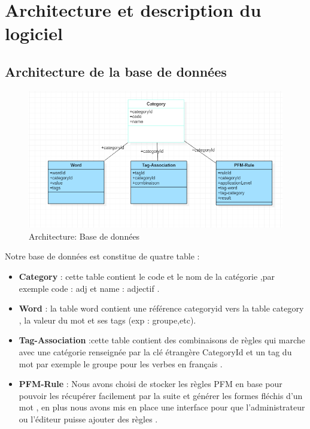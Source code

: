 \documentclass[12pt,a4paper]{article}
\begin{document}
\section{Architecture et description du logiciel}
\subsection{Architecture de la base de données }





\begin{figure}[h]
\centering
\includegraphics[width=150mm]{img/basefinal.PNG}
\caption{Architecture: Base de données}
\label{Tux}
\end{figure}

\newpage
Notre base de données est constitue de quatre table : 
\begin{itemize}
\item \textbf{Category} : cette table contient le code et le nom de la catégorie ,par exemple code : adj et name : adjectif .
\item \textbf{Word} : la table word contient une référence categoryid vers la table category , la valeur du mot et ses tags (exp : groupe,etc).
\item \textbf{Tag-Association} :cette table contient des combinaisons de règles qui marche avec une catégorie renseignée par la clé étrangère CategoryId  et un tag du mot par exemple le groupe pour les verbes en français .
\item \textbf{PFM-Rule} : Nous avons choisi de stocker les règles PFM en base pour pouvoir les récupérer facilement par la suite et générer les formes fléchis d'un mot , en plus nous avons mis en place une interface pour que l'administrateur ou l'éditeur puisse ajouter des règles .

\end{itemize}
\end{document}
